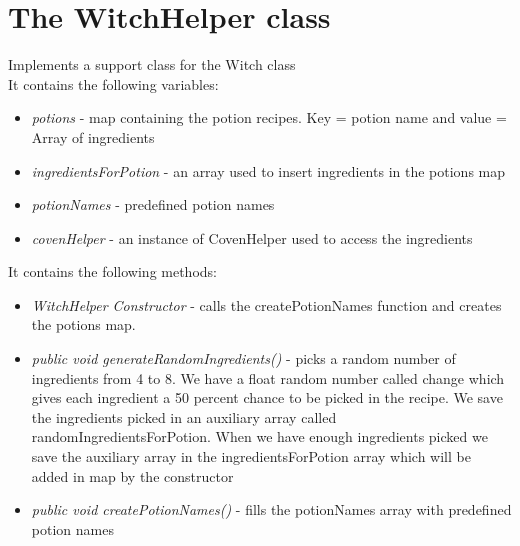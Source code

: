 \documentclass[14pt]{article}
\begin{document}
\section*{The WitchHelper class}
\vspace{5 mm}
Implements a support class for the Witch class\\
It contains the following variables:\\ 
\begin{itemize}
            \item \textit{potions} - map containing the potion recipes. Key = potion name and value = Array of ingredients
            \item \textit{ingredientsForPotion} - an array used to insert ingredients in the potions map
            \item \textit{potionNames} - predefined potion names
            \item \textit{covenHelper} - an instance of CovenHelper used to access the ingredients
\end{itemize}
It contains the following methods:\\
\begin{itemize}
            \item \textit{WitchHelper Constructor} - calls the createPotionNames function and creates the potions map.
            \item \textit{public void generateRandomIngredients()} - picks a random number of ingredients from 4 to 8. We have a float random number called change which gives each ingredient a 50 percent chance to be picked in the recipe. We save the ingredients picked in an auxiliary array called randomIngredientsForPotion. When we have enough ingredients picked we save the auxiliary array in the ingredientsForPotion array which will be added in map by the constructor
            \item \textit{public void createPotionNames()} - fills the potionNames array with predefined potion names
\end{itemize}
\end{document}
